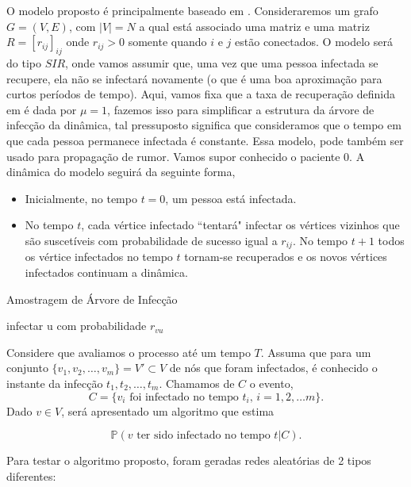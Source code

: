 \documentclass{article}
\newcommand{\Pp}{\mathbb{P}}
\begin{document}
O modelo proposto é principalmente baseado em \cite{Main, Main2}. Consideraremos um grafo $G = (V,E)$, com $|V| = N$ a qual está associado uma matriz e uma matriz $R = [r_{ij}]_{ij}$ onde $r_{ij} > 0$ somente quando $i$ e $j$ estão conectados. O modelo será do tipo $SIR$, onde vamos assumir que, uma vez que uma pessoa infectada se recupere, ela não se infectará novamente (o que é uma boa aproximação para curtos períodos de tempo). Aqui, vamos fixa que a taxa de recuperação definida em \cite{Main} é dada por $\mu = 1$, fazemos isso para simplificar a estrutura da árvore de infecção da dinâmica, tal pressuposto significa que consideramos que o tempo em que cada pessoa permanece infectada é constante. Essa modelo, pode também ser usado para propagação de rumor. Vamos supor conhecido o paciente 0. A dinâmica do modelo seguirá da seguinte forma,

\begin{itemize}
    \item Inicialmente, no tempo $t = 0$, um pessoa está infectada.
    \item No tempo $t$, cada vértice infectado ``tentará" infectar os vértices vizinhos que são suscetíveis com probabilidade de sucesso igual a $r_{ij}$. No tempo $t + 1$ todos os vértice infectados no tempo $t$ tornam-se recuperados e os novos vértices infectados continuam a dinâmica. 
\end{itemize}

\begin{algorithm}
\caption{Amostragem de Árvore de Infecção} \label{alg:arv}
\begin{algorithmic}
                \State infectar u com probabilidade $r_{vu}$
            \EndIf
        \EndFor
    \EndFor
\EndFor 
\end{algorithmic}
\end{algorithm}

Considere que avaliamos o processo até um tempo $T$. Assuma que para um conjunto $ \{v_1, v_2, \dots, v_m\} = V' \subset V$ de nós que foram infectados, é conhecido o instante da infecção $t_1, t_2, \dots, t_m$. Chamamos de $C$ o evento,
\[C = \{v_i \textrm{ foi infectado no tempo } t_i, \, i = 1,2, \dots m\}.\]
Dado $v \in V$, será apresentado um algoritmo que estima

\[\Pp(v \textrm{ ter sido infectado no tempo }  t|C).\]

Para testar o algoritmo proposto, foram geradas redes aleatórias de 2 tipos diferentes:
\end{document}
